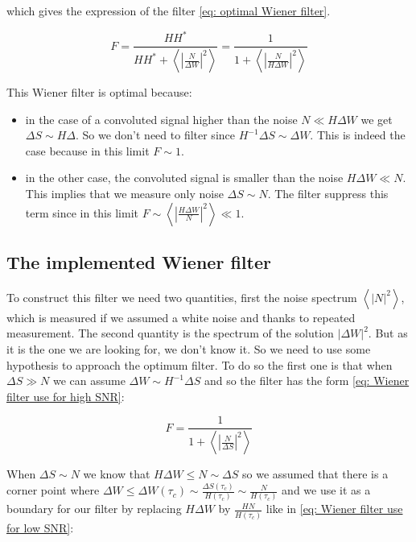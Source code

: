 which gives the expression of the filter \eqref{eq: optimal Wiener filter}.

\begin{equation}
	F = \frac{HH^{\ast}}{HH^{\ast}+\left<\left|\frac{N}{\Delta W}\right|^{2}\right>} = \frac{1}{1+\left<\left|\frac{N}{H\Delta W}\right|^{2}\right>} \label{eq: optimal Wiener filter}
\end{equation}

This Wiener filter \cite{wiener1949extrapolation} is optimal because:
\begin{itemize}
	\item in the case of a convoluted signal higher than the noise $N\ll H\Delta W$ we get $\Delta S \sim H\Delta$. So we don't need to filter since $H^{-1}\Delta S \sim \Delta W$. This is indeed the case because in this limit $F \sim 1$.
	\item in the other case, the convoluted signal is smaller than the noise $H\Delta W\ll N$. This implies that we measure only noise $\Delta S \sim N$. The filter suppress this term since in this limit $F \sim \left<\left|\frac{H\Delta W}{N}\right|^{2}\right> \ll 1$.
\end{itemize}

\subsection{\texorpdfstring{The implemented Wiener filter}{The implemented Wiener filter}}

To construct this filter we need two quantities, first the noise spectrum $\left<\left|N\right|^{2}\right>$, which is measured if we assumed a white noise and thanks to repeated measurement. The second quantity is the spectrum of the solution $|\Delta W|^{2}$. But as it is the one we are looking for, we don't know it. So we need to use some hypothesis to approach the optimum filter. To do so the first one is that when $\Delta S \gg N$ we can assume $\Delta W \sim H^{-1}\Delta S$ and so the filter has the form \eqref{eq: Wiener filter use for high SNR}:

\begin{equation}
	F = \frac{1}{1+\left<\left|\frac{N}{\Delta S}\right|^{2}\right>} \label{eq: Wiener filter use for high SNR}
\end{equation}

When $\Delta S \sim N$ we know that $H\Delta W \leq N \sim \Delta S$ so we assumed that there is a corner point where $\Delta W \leq \Delta W(\tau_{c}) \sim \frac{\Delta S(\tau_{c})}{H(\tau_{c})}  \sim \frac{N}{H(\tau_{c})}$ and we use it as a boundary for our filter by replacing $H\Delta W$ by $\frac{HN}{H(\tau_{c})}$ like in \eqref{eq: Wiener filter use for low SNR}:

